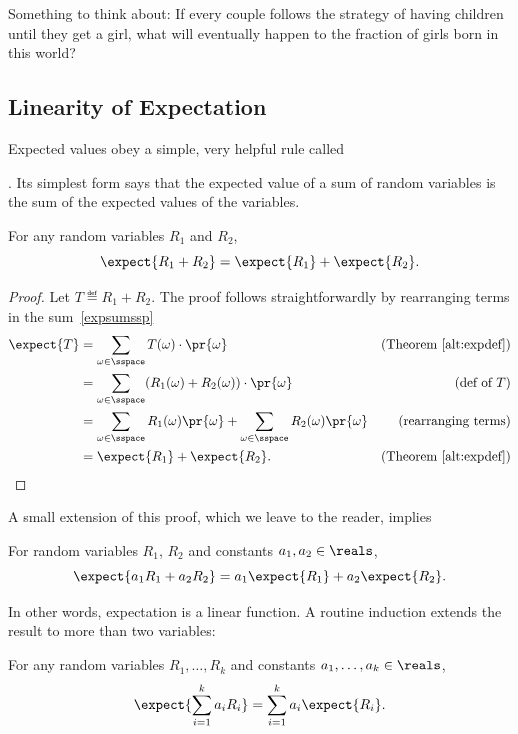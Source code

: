 Something to think about: If every couple follows the strategy of having
children until they get a girl, what will eventually happen to the
fraction of girls born in this world?

\subsection{Linearity of Expectation}\label{finlin}

Expected values obey a simple, very helpful rule called
.  Its
simplest form says that the expected value of a sum of random variables is
the sum of the expected values of the variables.

\begin{theorem}\label{expsum-2}
For any random variables $R_1$ and $R_2$,
\[
\expect{R_1 + R_2} = \expect{R_1} + \expect{R_2}.
\]
\end{theorem}

\begin{proof}
Let $T \eqdef R_1+R_2$.  The proof follows straightforwardly by
rearranging terms in the sum~\eqref{expsumssp}
\begin{align*}
\expect{T} & = \sum_{\omega \in \sspace} T(\omega) \cdot \pr{\omega}
                & \text{(Theorem~\ref{alt:expdef})}\\
        & = \sum_{\omega \in \sspace} (R_1(\omega) + R_2(\omega)) \cdot \pr{\omega}
                         & \text{(def of $T$)}\\
        & = \sum_{\omega \in \sspace} R_1(\omega) \pr{\omega} + 
              \sum_{\omega \in \sspace} R_2(\omega) \pr{\omega} & \text{(rearranging terms)}\\
        & = \expect{R_1} + \expect{R_2}.   & \text{(Theorem~\ref{alt:expdef})}
\end{align*}
\end{proof}

A small extension of this proof, which we leave to the reader, implies
\begin{theorem}
For random variables $R_1$, $R_2$ and constants $a_1,a_2 \in \reals$,
\[
\expect{a_1R_1 + a_2R_2} = a_1\expect{R_1} + a_2\expect{R_2}.
\]
\end{theorem}
In other words, expectation is a linear function.  A routine induction
extends the result to more than two variables:
\begin{corollary}
For any random variables $R_1, \dots, R_k$ and constants $a_1, \dots, a_k
\in \reals$,
\[
\expect{\sum_{i=1}^k a_iR_i} = \sum_{i=1}^k a_i\expect{R_i}.
\]
\end{corollary}

